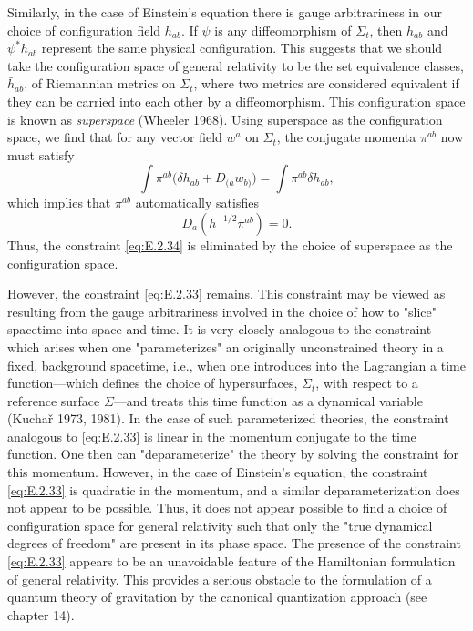 Similarly, in the case of Einstein's equation there is gauge arbitrariness in our
choice of configuration field \(h_{ab}\). If \(\psi\) is any diffeomorphism of
\(\Sigma_t\), then \(h_{ab}\) and \(\psi^*h_{ab}\) represent the same physical
configuration. This suggests that we should take the configuration space of general
relativity to be the set equivalence classes, \(\bar h_{ab}\), of Riemannian metrics
on \(\Sigma_t\), where two metrics are considered equivalent if they can be carried
into each other by a diffeomorphism. This configuration space is known as
\emph{superspace} (Wheeler 1968). Using superspace as the configuration space, we
find that for any vector field \(w^a\) on \(\Sigma_t\), the conjugate momenta
\(\pi^{ab}\) now must satisfy
\begin{equation}
  \int\pi^{ab}\bigl(\delta h_{ab}+D_{(a}w_{b)}\bigr)
    =\int\pi^{ab}\delta h_{ab},
  \tag{E.2.42}\label{eq:E.2.42}
\end{equation}
which implies that \(\pi^{ab}\) automatically satisfies
\begin{equation}
  D_a(h^{-1/2}\pi^{ab})=0.
  \tag{E.2.43}\label{eq:E.2.43}
\end{equation}
Thus, the constraint \eqref{eq:E.2.34} is eliminated by the choice of superspace as
the configuration space.

However, the constraint \eqref{eq:E.2.33} remains. This constraint may be viewed
as resulting from the gauge arbitrariness involved in the choice of how to "slice"
spacetime into space and time. It is very closely analogous to the constraint which
arises when one "parameterizes" an originally unconstrained theory in a fixed,
background spacetime, i.e., when one introduces into the Lagrangian a time
function---which defines the choice of hypersurfaces, \(\Sigma_t\), with respect to
a reference surface \(\Sigma\)---and treats this time function as a dynamical
variable (Kuchař 1973, 1981). In the case of such parameterized theories, the
constraint analogous to \eqref{eq:E.2.33} is linear in the momentum conjugate to
the time function. One then can "deparameterize" the theory by solving the
constraint for this momentum. However, in the case of Einstein's equation, the
constraint \eqref{eq:E.2.33} is quadratic in the momentum, and a similar
deparameterization does not appear to be possible. Thus, it does not appear possible
to find a choice of configuration space for general relativity such that only the
"true dynamical degrees of freedom" are present in its phase space. The presence of
the constraint \eqref{eq:E.2.33} appears to be an unavoidable feature of the
Hamiltonian formulation of general relativity. This provides a serious obstacle to
the formulation of a quantum theory of gravitation by the canonical quantization
approach (see chapter 14).


